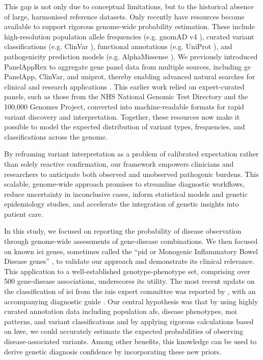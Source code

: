This gap is not only due to conceptual limitations, but to the historical absence of large, harmonised reference datasets. 
Only recently have resources become available to support rigorous genome-wide probability estimation. These include high-resolution population allele frequencies (e.g. gnomAD v4 \cite{karczewski2020mutational}), 
curated variant classifications (e.g. ClinVar \cite{landrum_clinvar_2018}), 
functional annotations (e.g. UniProt \cite{the_uniprot_consortium_uniprot_2025}),
and pathogenicity prediction models (e.g. AlphaMissense \cite{cheng_accurate_2023}). 
We previously introduced PanelAppRex to aggregate gene panel data from multiple sources, including \ac{ge} PanelApp, ClinVar, and \ac{uniprot}, thereby enabling advanced natural searches for clinical and research applications \cite{lawless_panelapprex_2025, martin_panelapp_2019, landrum_clinvar_2018, the_uniprot_consortium_uniprot_2025}. 
This earlier work relied on expert-curated panels, such as those from the NHS National Genomic Test Directory and the 100,000 Genomes Project, converted into machine-readable formats for rapid variant discovery and interpretation. 
Together, these resources now make it possible to model the expected distribution of variant types, frequencies, and classifications across the genome.

By reframing variant interpretation as a problem of calibrated expectation rather than solely reactive confirmation, our framework empowers clinicians and researchers to anticipate both observed and unobserved pathogenic burdens. 
This scalable, genome-wide approach promises to streamline diagnostic workflows, reduce uncertainty in inconclusive cases, inform statistical models and genetic epidemiology studies, and accelerate the integration of genetic insights into patient care.

In this study, we focused on reporting the probability of disease observation through genome-wide assessments of gene-disease combinations. 
We then focused on known \ac{iei} genes, sometimes called the ``\ac{pid} or Monogenic Inflammatory Bowel Disease genes'' \cite{poli_human_2025, lawless_panelapprex_2025, martin_panelapp_2019},
to validate our approach and demonstrate its clinical relevance. 
This application to a well-established genotype-phenotype set, comprising over 500 gene-disease associations, underscores its utility.
The most recent update on the classification 
of \ac{iei} from the \ac{iuis}  expert committee was reported by \citet{poli_human_2025},
with an accompanying diagnostic guide \cite{bousfiha_2024_2025}.
Our central hypothesis was that by using highly curated annotation data including population \ac{af}s, disease phenotypes, \ac{moi} patterns, and variant classifications and by applying rigorous calculations based on \ac{hwe}, we could accurately estimate the expected probabilities of observing disease-associated variants.
Among other benefits, this knowledge can be used to derive genetic diagnosis confidence by incorporating these new priors.

